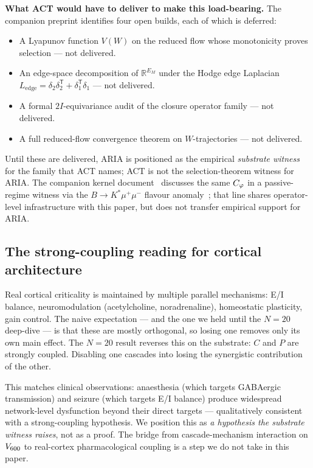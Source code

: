 \textbf{What ACT would have to deliver to make this load-bearing.}
The companion preprint identifies four open builds, each of which is
deferred:
\begin{itemize}\itemsep=2pt
\item A Lyapunov function $V(W)$ on the reduced flow whose
  monotonicity proves selection — not delivered.
\item An edge-space decomposition of $\mathbb{R}^{E_{M}}$ under the
  Hodge edge Laplacian $L_{\mathrm{edge}} = \delta_{2}\delta_{2}^{\mathsf T} +
  \delta_{1}^{\mathsf T}\delta_{1}$ — not delivered.
\item A formal $2I$-equivariance audit of the closure operator
  family — not delivered.
\item A full reduced-flow convergence theorem on
  $W$-trajectories — not delivered.
\end{itemize}
Until these are delivered, ARIA is positioned as the empirical
\emph{substrate witness} for the family that ACT names; ACT is not the
selection-theorem witness for ARIA. The companion kernel
document~\citep{SmartAriaClosureKernel2026} discusses the same $C_{\varphi}$
in a passive-regime witness via the $B\to K^{*}\mu^{+}\mu^{-}$ flavour
anomaly~\citep{SmartBAnomaly2026}; that line shares operator-level
infrastructure with this paper, but does not transfer empirical
support for ARIA.

\subsection{The strong-coupling reading for cortical architecture}

Real cortical criticality is maintained by multiple parallel
mechanisms: E/I balance, neuromodulation (acetylcholine, noradrenaline),
homeostatic plasticity, gain control. The naive expectation — and the
one we held until the $N\!=\!20$ deep-dive — is that these are mostly
orthogonal, so losing one removes only its own main effect. The
$N\!=\!20$ result reverses this on the substrate: $C$ and $P$ are
strongly coupled. Disabling one cascades into losing the synergistic
contribution of the other.

This matches clinical observations: anaesthesia (which targets
GABAergic transmission) and seizure (which targets E/I balance)
produce widespread network-level dysfunction beyond their direct
targets — qualitatively consistent with a strong-coupling hypothesis. We position this as
\emph{a hypothesis the substrate witness raises}, not as a proof.
The bridge from cascade-mechanism interaction on $V_{600}$ to
real-cortex pharmacological coupling is a step we do not take in
this paper.

